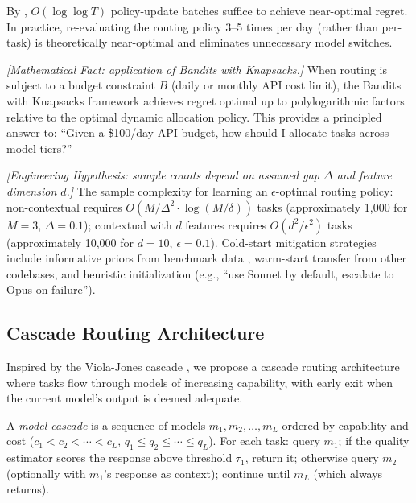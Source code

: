 \begin{corollary}
\label{cor:routing-batched}
By \citet{perchet2016batched}, $O(\log \log T)$ policy-update batches suffice to achieve near-optimal regret. In practice, re-evaluating the routing policy 3--5 times per day (rather than per-task) is theoretically near-optimal and eliminates unnecessary model switches.
\end{corollary}

\begin{proposition}
\emph{[Mathematical Fact: application of Bandits with Knapsacks.]}
\label{prop:routing-bwk}
When routing is subject to a budget constraint $B$ (daily or monthly API cost limit), the Bandits with Knapsacks framework achieves regret optimal up to polylogarithmic factors relative to the optimal dynamic allocation policy. This provides a principled answer to: ``Given a \$100/day API budget, how should I allocate tasks across model tiers?''
\end{proposition}

\begin{proposition}
\emph{[Engineering Hypothesis: sample counts depend on assumed gap $\Delta$ and feature dimension $d$.]}
\label{prop:routing-sample}
The sample complexity for learning an $\epsilon$-optimal routing policy: non-contextual requires $O(M / \Delta^2 \cdot \log(M / \delta))$ tasks (approximately 1,000 for $M = 3$, $\Delta = 0.1$); contextual with $d$ features requires $O(d^2 / \epsilon^2)$ tasks (approximately 10,000 for $d = 10$, $\epsilon = 0.1$). Cold-start mitigation strategies include informative priors from benchmark data \citep{agrawal2012thompson}, warm-start transfer from other codebases, and heuristic initialization (e.g., ``use Sonnet by default, escalate to Opus on failure'').
\end{proposition}

\subsection{Cascade Routing Architecture}

Inspired by the Viola-Jones cascade \citep{violajones2001, violajones2004}, we propose a cascade routing architecture where tasks flow through models of increasing capability, with early exit when the current model's output is deemed adequate.

\begin{definition}
\label{def:routing-cascade}
A \emph{model cascade} is a sequence of models $m_1, m_2, \ldots, m_L$ ordered by capability and cost ($c_1 < c_2 < \cdots < c_L$, $q_1 \leq q_2 \leq \cdots \leq q_L$). For each task: query $m_1$; if the quality estimator scores the response above threshold $\tau_1$, return it; otherwise query $m_2$ (optionally with $m_1$'s response as context); continue until $m_L$ (which always returns).
\end{definition}

